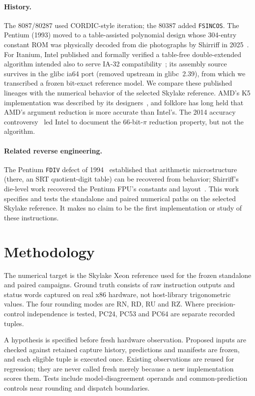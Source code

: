 \documentclass[11pt]{article}
\newcommand{\instr}[1]{\texttt{#1}}
\begin{document}
\paragraph{History.}  The 8087/80287 used CORDIC-style iteration; the
80387 added \instr{FSINCOS}.  The Pentium (1993) moved to a
table-assisted polynomial design whose 304-entry constant ROM was
physically decoded from die photographs by Shirriff in
2025~\cite{shirriff2025}.  For Itanium, Intel published and formally
verified a table-free double-extended algorithm intended also to serve
IA-32 compatibility~\cite{harrison2000,harrison1999}; its assembly
source survives in the glibc ia64 port (removed upstream in
glibc~2.39), from which we transcribed a frozen bit-exact reference
model.  We compare these published lineages with the numerical behavior
of the selected Skylake reference.  AMD's K5
implementation was described by its designers~\cite{lynch1995}, and
folklore has long held that AMD's argument reduction is more accurate
than Intel's.  The 2014 accuracy controversy~\cite{dawson2014} led
Intel to document the 66-bit-$\pi$ reduction property, but not the
algorithm.

\paragraph{Related reverse engineering.}  The Pentium \instr{FDIV}
defect of 1994~\cite{nicely1994,coe1995} established that arithmetic
microstructure (there, an SRT quotient-digit table) can be recovered
from behavior; Shirriff's die-level work recovered the Pentium FPU's
constants and layout~\cite{shirriff2025}.  This work specifies and tests
the standalone and paired numerical paths on the selected Skylake reference.
It makes no claim to be the first implementation or study of these instructions.

\section{Methodology}
\label{sec:method}

The numerical target is the Skylake Xeon reference used for the frozen
standalone and paired campaigns. Ground truth consists of raw instruction outputs and
status words captured on real x86 hardware, not host-library trigonometric
values. The four rounding modes are RN, RD, RU and RZ. Where precision-control
independence is tested, PC24, PC53 and PC64 are separate recorded tuples.

A hypothesis is specified before fresh hardware observation. Proposed inputs
are checked against retained capture history, predictions and manifests are
frozen, and each eligible tuple is executed once. Existing observations are
reused for regression; they are never called fresh merely because a new
implementation scores them. Tests include model-disagreement operands and
common-prediction controls near rounding and dispatch boundaries.
\end{document}
